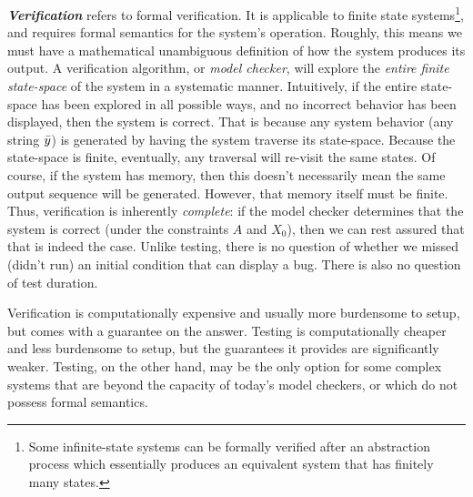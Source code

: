 \emph{\textbf{Verification}} refers to formal verification.
It is applicable to finite state systems\footnote{Some infinite-state systems can be formally verified after an abstraction process which essentially produces an equivalent system that has finitely many states.}, 
and requires formal semantics for the system's operation. 
Roughly, this means we must have a mathematical unambiguous definition of how the system produces its output.
A verification algorithm, or \emph{model checker}, will explore the \emph{entire finite state-space} of the system in a systematic manner. 
Intuitively, if the entire state-space has been explored in all possible ways, and no incorrect behavior has been displayed, then the system is correct. 
That is because any system behavior (any string $\bar{y}$) is generated by having the system traverse its state-space.
Because the state-space is finite, eventually, any traversal will re-visit the same states.
Of course, if the system has memory, then this doesn't necessarily mean the same output sequence will be generated.
However, that memory itself must be finite.
Thus, verification is inherently \emph{complete}: if the model checker determines that the system is correct (under the constraints $A$ and $X_0$), then we can rest assured that that is indeed the case.
Unlike testing, there is no question of whether we missed (didn't run) an initial condition that can display a bug.
There is also no question of test duration.

Verification is computationally expensive and usually more burdensome to setup, but comes with a guarantee on the answer. 
Testing is computationally cheaper and less burdensome to setup, but the guarantees it provides are significantly weaker.
Testing, on the other hand, may be the only option for some complex systems that are beyond the capacity of today's model checkers, or which do not possess formal semantics.






